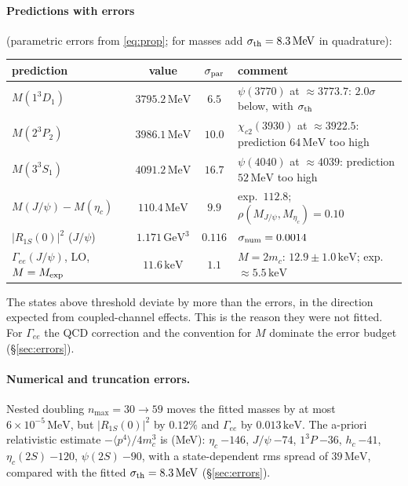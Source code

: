 \documentclass[11pt,a4paper]{article}
\numberwithin{equation}{section}
\theoremstyle{definition}
\theoremstyle{plain}
\theoremstyle{remark}
\numberwithin{algorithm}{section}
\newcommand{\GeV}{\,\mathrm{GeV}}
\newcommand{\MeV}{\,\mathrm{MeV}}
\newcommand{\keV}{\,\mathrm{keV}}
\begin{document}
\paragraph{Predictions with errors} (parametric errors from \eqref{eq:prop}; for masses add $\sigma_{\rm th}=8.3\MeV$ in quadrature):
\begin{center}\small
\begin{tabular}{@{}lccl@{}}\toprule
prediction & value & $\sigma_{\rm par}$ & comment\\\midrule
$M(1^3D_1)$ & $3795.2\MeV$ & $6.5$ & $\psi(3770)$ at $\approx3773.7$: $2.0\sigma$ below, with $\sigma_{\rm th}$\\
$M(2^3P_2)$ & $3986.1\MeV$ & $10.0$ & $\chi_{c2}(3930)$ at $\approx3922.5$: prediction $64\MeV$ too high\\
$M(3^3S_1)$ & $4091.2\MeV$ & $16.7$ & $\psi(4040)$ at $\approx4039$: prediction $52\MeV$ too high\\
$M(J/\psi)-M(\eta_c)$ & $110.4\MeV$ & $9.9$ & exp.\ $112.8$; $\rho(M_{J/\psi},M_{\eta_c})=0.10$\\
$|R_{1S}(0)|^2$ ($J/\psi$) & $1.171\GeV^3$ & $0.116$ & $\sigma_{\rm num}=0.0014$\\
$\Gamma_{ee}(J/\psi)$, LO, $M=M_{\rm exp}$ & $11.6\keV$ & $1.1$ & $M=2m_c$: $12.9\pm1.0\keV$; exp.\ $\approx5.5\keV$\\\bottomrule
\end{tabular}
\end{center}
The states above threshold deviate by more than the errors, in the direction expected from coupled-channel effects. This is the reason they were not fitted. For $\Gamma_{ee}$ the QCD correction and the convention for $M$ dominate the error budget (\S\ref{sec:errors}).

\paragraph{Numerical and truncation errors.} Nested doubling $n_{\max}=30\to59$ moves the fitted masses by at most $6\times10^{-5}\MeV$, but $|R_{1S}(0)|^2$ by $0.12\%$ and $\Gamma_{ee}$ by $0.013\keV$. The a-priori relativistic estimate $-\langle p^4\rangle/4m_c^3$ is (MeV): $\eta_c\ {-146}$, $J/\psi\ {-74}$, $1^3P\ {-36}$, $h_c\ {-41}$, $\eta_c(2S)\ {-120}$, $\psi(2S)\ {-90}$, with a state-dependent rms spread of $39\MeV$, compared with the fitted $\sigma_{\rm th}=8.3\MeV$ (\S\ref{sec:errors}).

\end{document}
